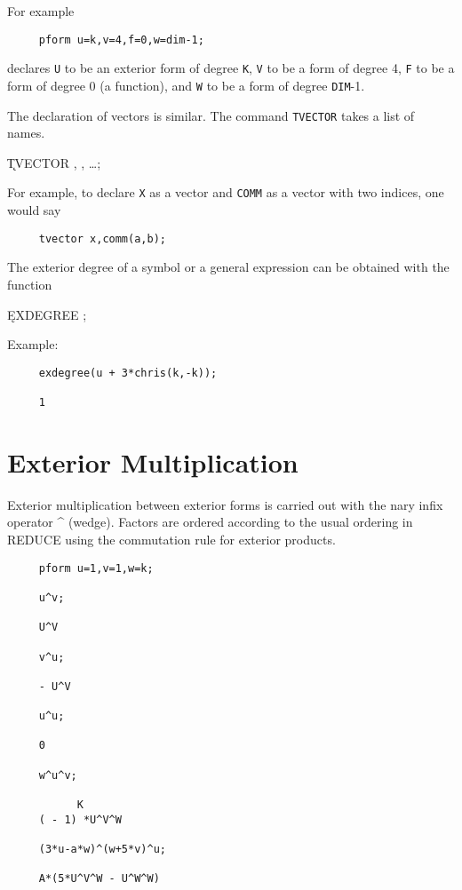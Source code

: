 \documentclass[11pt,letterpaper]{book}
\newcommand{\REDUCE}{REDUCE}
\begin{document}
For example

{\small\begin{verbatim}
     pform u=k,v=4,f=0,w=dim-1;
\end{verbatim}}

declares {\tt U} to be an exterior form of degree {\tt K}, {\tt V} to be a
form of degree 4, {\tt F} to be a form of degree 0 (a function), and {\tt W}
to be a form of degree {\tt DIM}-1.

The declaration of vectors is similar. The command {\tt TVECTOR}\label{TVECTOR}
takes a list of names.

\hspace*{2em} \k{TVECTOR} , , \ldots;

For example, to declare {\tt X} as a vector and {\tt COMM} as a vector with
two indices, one would say

{\small\begin{verbatim}
     tvector x,comm(a,b);
\end{verbatim}}

The exterior degree of a symbol or a general expression can be obtained
with the function \label{EXDEGREE}

\hspace*{2em} \k{EXDEGREE} ;

Example:
{\small\begin{verbatim}
     exdegree(u + 3*chris(k,-k));

     1
\end{verbatim}}

\section{Exterior Multiplication}

Exterior multiplication between exterior forms is carried out with the
nary infix operator \^{ } (wedge)\label{wedge}.  Factors are ordered
according to the usual ordering in {\REDUCE} using the commutation
rule for exterior products.
{\small\begin{verbatim}
     pform u=1,v=1,w=k;

     u^v;

     U^V

     v^u;

     - U^V

     u^u;

     0

     w^u^v;

           K
     ( - 1) *U^V^W

     (3*u-a*w)^(w+5*v)^u;

     A*(5*U^V^W - U^W^W)
\end{verbatim}}
\end{document}
